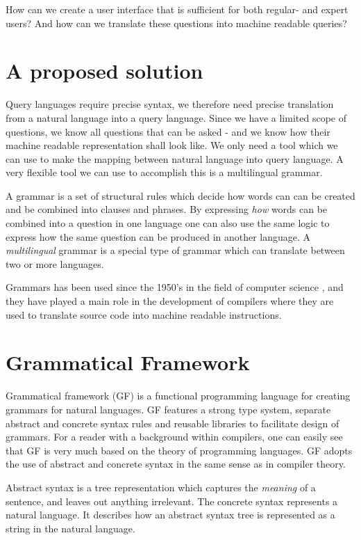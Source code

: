 How can we create a user interface that is sufficient for both regular- and expert users? And how can we translate these questions into machine readable queries?

\section{A proposed solution}
Query languages require precise syntax, we therefore need precise translation from a natural language into a query language. Since we have a limited scope of questions, we know all questions that can be asked - and we know how their machine readable representation shall look like. We only need a tool which we can use to make the mapping between natural language into query language. A very flexible tool we can use to accomplish this is a multilingual grammar. 

A grammar is a set of structural rules which decide how words can can be created and be combined into clauses and phrases. By expressing \emph{how} words can be combined into a question in one language one can also use the same logic to express how the same question can be produced in another language. A \emph{multilingual} grammar is a special type of grammar which can translate between two or more languages.

Grammars has been used since the 1950's in the field of computer science \cite[p. 4]{ranta:2011}, and they have played a main role in the development of compilers where they are used to translate source code into machine readable instructions.

\section{Grammatical Framework}
Grammatical framework (GF) is a functional programming language for creating grammars for natural languages.\cite[p. 1]{ranta:2011} GF features a strong type system, separate abstract and concrete syntax rules and reusable libraries to facilitate design of grammars. For a reader with a background within compilers, one can easily see that GF is very much based on the theory of programming languages. GF adopts the use of abstract and concrete syntax in the same sense as in compiler theory. 

Abstract syntax is a tree representation which captures the \emph{meaning} of a sentence, and leaves out anything irrelevant. The concrete syntax represents a natural language. It describes how an abstract syntax tree is represented as a string in the natural language.

